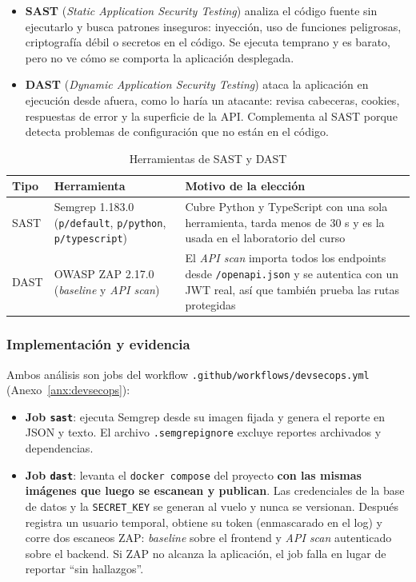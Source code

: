 \begin{itemize}
    \item \textbf{SAST} (\textit{Static Application Security Testing}) analiza el código fuente sin ejecutarlo y busca patrones inseguros: inyección, uso de funciones peligrosas, criptografía débil o secretos en el código. Se ejecuta temprano y es barato, pero no ve cómo se comporta la aplicación desplegada.
    \item \textbf{DAST} (\textit{Dynamic Application Security Testing}) ataca la aplicación en ejecución desde afuera, como lo haría un atacante: revisa cabeceras, cookies, respuestas de error y la superficie de la API. Complementa al SAST porque detecta problemas de configuración que no están en el código.
\end{itemize}

\begin{table}[H]
    \centering
    \small
    \caption{Herramientas de SAST y DAST}
    \begin{tabularx}{\textwidth}{@{}l p{4.2cm} X@{}}
        \toprule
        \textbf{Tipo} & \textbf{Herramienta} & \textbf{Motivo de la elección} \\
        \midrule
        SAST & Semgrep 1.183.0 (\texttt{p/default}, \texttt{p/python}, \texttt{p/typescript}) & Cubre Python y TypeScript con una sola herramienta, tarda menos de 30 s y es la usada en el laboratorio del curso \\
        DAST & OWASP ZAP 2.17.0 (\textit{baseline} y \textit{API scan}) & El \textit{API scan} importa todos los endpoints desde \texttt{/openapi.json} y se autentica con un JWT real, así que también prueba las rutas protegidas \\
        \bottomrule
    \end{tabularx}
\end{table}

\subsubsection{Implementación y evidencia}

Ambos análisis son jobs del workflow \texttt{.github/workflows/devsecops.yml} (Anexo~\ref{anx:devsecops}):

\begin{itemize}
    \item \textbf{Job \texttt{sast}}: ejecuta Semgrep desde su imagen fijada y genera el reporte en JSON y texto. El archivo \texttt{.semgrepignore} excluye reportes archivados y dependencias.
    \item \textbf{Job \texttt{dast}}: levanta el \texttt{docker compose} del proyecto \textbf{con las mismas imágenes que luego se escanean y publican}. Las credenciales de la base de datos y la \texttt{SECRET\_KEY} se generan al vuelo y nunca se versionan. Después registra un usuario temporal, obtiene su token (enmascarado en el log) y corre dos escaneos ZAP: \textit{baseline} sobre el frontend y \textit{API scan} autenticado sobre el backend. Si ZAP no alcanza la aplicación, el job falla en lugar de reportar ``sin hallazgos''.
\end{itemize}

